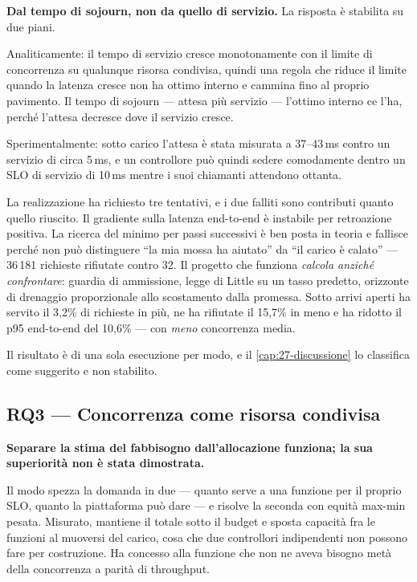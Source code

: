 \textbf{Dal tempo di sojourn, non da quello di servizio.} La risposta \`e
stabilita su due piani.

Analiticamente: il tempo di servizio cresce monotonamente con il limite di
concorrenza su qualunque risorsa condivisa, quindi una regola che riduce il
limite quando la latenza cresce non ha ottimo interno e cammina fino al proprio
pavimento. Il tempo di sojourn --- attesa pi\`u servizio --- l'ottimo interno ce
l'ha, perch\'e l'attesa decresce dove il servizio cresce.

Sperimentalmente: sotto carico l'attesa \`e stata misurata a 37--43\,ms contro un
servizio di circa 5\,ms, e un controllore pu\`o quindi sedere comodamente dentro
un SLO di servizio di 10\,ms mentre i suoi chiamanti attendono ottanta.

La realizzazione ha richiesto tre tentativi, e i due falliti sono contributi
quanto quello riuscito. Il gradiente sulla latenza end-to-end \`e instabile per
retroazione positiva. La ricerca del minimo per passi successivi \`e ben posta in
teoria e fallisce perch\'e non pu\`o distinguere ``la mia mossa ha aiutato'' da
``il carico \`e calato'' --- 36\,181 richieste rifiutate contro 32. Il progetto
che funziona \emph{calcola anzich\'e confrontare}: guardia di ammissione, legge di
Little su un tasso predetto, orizzonte di drenaggio proporzionale allo
scostamento dalla promessa. Sotto arrivi aperti ha servito il 3{,}2\% di
richieste in pi\`u, ne ha rifiutate il 15{,}7\% in meno e ha ridotto il p95
end-to-end del 10{,}6\% --- con \emph{meno} concorrenza media.

Il risultato \`e di una sola esecuzione per modo, e il
\cref{cap:27-discussione} lo classifica come suggerito e non stabilito.

\subsection{RQ3 --- Concorrenza come risorsa condivisa}

\textbf{Separare la stima del fabbisogno dall'allocazione funziona; la sua
superiorit\`a non \`e stata dimostrata.}

Il modo  spezza la domanda in due --- quanto serve a una funzione
per il proprio SLO, quanto la piattaforma pu\`o dare --- e risolve la seconda con
equit\`a max-min pesata. Misurato, mantiene il totale sotto il budget e sposta
capacit\`a fra le funzioni al muoversi del carico, cosa che due controllori
indipendenti non possono fare per costruzione. Ha concesso alla funzione che non
ne aveva bisogno met\`a della concorrenza a parit\`a di throughput.

